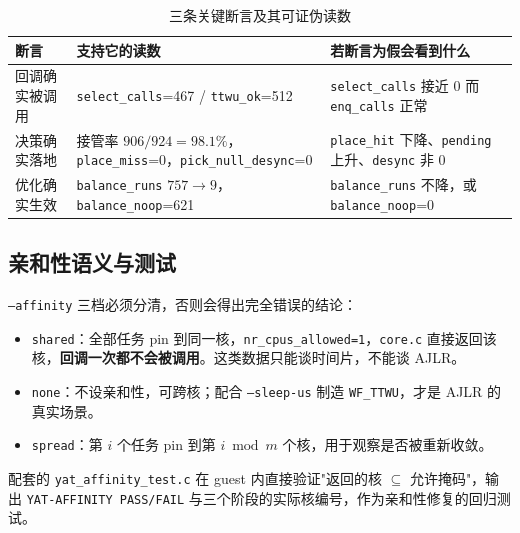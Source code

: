 \begin{table}[H]
\centering
\caption{三条关键断言及其可证伪读数}
\label{tab:assert}
\small
\begin{tabular}{@{}>{\raggedright\arraybackslash}p{3.4cm}>{\raggedright\arraybackslash}p{4.8cm}>{\raggedright\arraybackslash}p{5.4cm}@{}}
\toprule
断言 & 支持它的读数 & 若断言为假会看到什么 \\
\midrule
回调确实被调用 & \texttt{select\_calls}=467 / \texttt{ttwu\_ok}=512 & \texttt{select\_calls} 接近 0 而 \texttt{enq\_calls} 正常 \\
决策确实落地 & 接管率 $906/924=98.1\%$，\texttt{place\_miss}=0，\texttt{pick\_null\_desync}=0 & \texttt{place\_hit} 下降、\texttt{pending} 上升、\texttt{desync} 非 0 \\
优化确实生效 & \texttt{balance\_runs} $757\to9$，\texttt{balance\_noop}=621 & \texttt{balance\_runs} 不降，或 \texttt{balance\_noop}=0 \\
\bottomrule
\end{tabular}
\end{table}

\subsection{亲和性语义与测试}

\texttt{--affinity} 三档必须分清，否则会得出完全错误的结论：

\begin{itemize}
  \item \texttt{shared}：全部任务 pin 到同一核，\texttt{nr\_cpus\_allowed=1}，\texttt{core.c} 直接返回该核，\textbf{回调一次都不会被调用}。这类数据只能谈时间片，不能谈 AJLR。
  \item \texttt{none}：不设亲和性，可跨核；配合 \texttt{--sleep-us} 制造 \texttt{WF\_TTWU}，才是 AJLR 的真实场景。
  \item \texttt{spread}：第 $i$ 个任务 pin 到第 $i\bmod m$ 个核，用于观察是否被重新收敛。
\end{itemize}

配套的 \texttt{yat\_affinity\_test.c} 在 guest 内直接验证"返回的核 $\subseteq$ 允许掩码"，输出 \texttt{YAT-AFFINITY PASS/FAIL} 与三个阶段的实际核编号，作为亲和性修复的回归测试。
